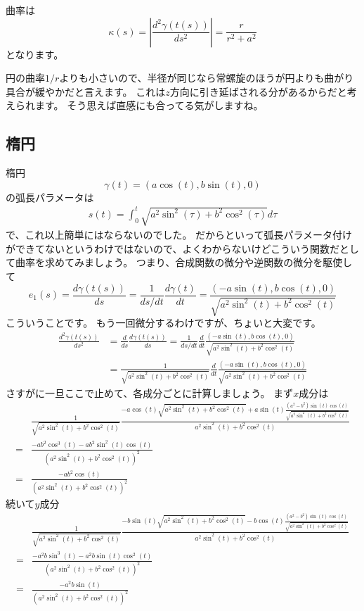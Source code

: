 曲率は
\[
  \kappa(s)=\left|\frac{d^2\gamma(t(s))}{ds^2}\right|=\frac{r}{r^2+a^2}
\]
となります。

円の曲率$1/r$よりも小さいので、半径が同じなら常螺旋のほうが円よりも曲がり具合が緩やかだと言えます。
これは$z$方向に引き延ばされる分があるからだと考えられます。
そう思えば直感にも合ってる気がしますね。

\subsection{楕円}

楕円
\[
  \gamma(t)=(a\cos(t),b\sin(t),0)
\]
の弧長パラメータは
\begin{align*}
  s(t)=\int_0^t\sqrt{a^2\sin^2(\tau)+b^2\cos^2(\tau)}d\tau
\end{align*}
で、これ以上簡単にはならないのでした。
だからといって弧長パラメータ付けができてないというわけではないので、よくわからないけどこういう関数だとして曲率を求めてみましょう。
つまり、合成関数の微分や逆関数の微分を駆使して
\[
  e_1(s)=\frac{d\gamma(t(s))}{ds}=\frac{1}{ds/dt}\frac{d\gamma(t)}{dt}=\frac{(-a\sin(t),b\cos(t),0)}{\sqrt{a^2\sin^2(t)+b^2\cos^2(t)}}
\]
こういうことです。
もう一回微分するわけですが、ちょいと大変です。
\begin{align*}
  \frac{d^2\gamma(t(s))}{ds^2}&=\frac{d}{ds}\frac{d\gamma(t(s))}{ds}=\frac{1}{ds/dt}\frac{d}{dt}\frac{(-a\sin(t),b\cos(t),0)}{\sqrt{a^2\sin^2(t)+b^2\cos^2(t)}}\\
  &=\frac{1}{\sqrt{a^2\sin^2(t)+b^2\cos^2(t)}}\frac{d}{dt}\frac{(-a\sin(t),b\cos(t),0)}{\sqrt{a^2\sin^2(t)+b^2\cos^2(t)}}
\end{align*}
さすがに一旦ここで止めて、各成分ごとに計算しましょう。
まず$x$成分は
\begin{align*}
  &\frac{1}{\sqrt{a^2\sin^2(t)+b^2\cos^2(t)}}\frac{-a\cos(t)\sqrt{a^2\sin^2(t)+b^2\cos^2(t)}+a\sin(t)\frac{(a^2-b^2)\sin(t)\cos(t)}{\sqrt{a^2\sin^2(t)+b^2\cos^2(t)}}}{a^2\sin^2(t)+b^2\cos^2(t)}\\
  =&\frac{-ab^2\cos^3(t)-ab^2\sin^2(t)\cos(t)}{(a^2\sin^2(t)+b^2\cos^2(t))^2}\\
  =&\frac{-ab^2\cos(t)}{(a^2\sin^2(t)+b^2\cos^2(t))^2}
\end{align*}
続いて$y$成分
\begin{align*}
  &\frac{1}{\sqrt{a^2\sin^2(t)+b^2\cos^2(t)}}\frac{-b\sin(t)\sqrt{a^2\sin^2(t)+b^2\cos^2(t)}-b\cos(t)\frac{(a^2-b^2)\sin(t)\cos(t)}{\sqrt{a^2\sin^2(t)+b^2\cos^2(t)}}}{a^2\sin^2(t)+b^2\cos^2(t)}\\
  =&\frac{-a^2b\sin^3(t)-a^2b\sin(t)\cos^2(t)}{(a^2\sin^2(t)+b^2\cos^2(t))^2}\\
  =&\frac{-a^2b\sin(t)}{(a^2\sin^2(t)+b^2\cos^2(t))^2}
\end{align*}
